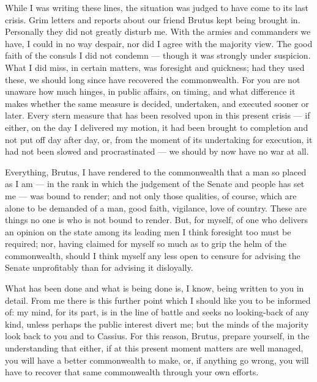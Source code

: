 

 While I was writing these lines, the situation was judged to have come to its last crisis. Grim letters and reports about our friend Brutus kept being brought in. Personally they did not greatly disturb me. With the armies and commanders we have, I could in no way despair, nor did I agree with the majority view. The good faith of the consuls I did not condemn --- though it was strongly under suspicion. What I did miss, in certain matters, was foresight and quickness; had they used these, we should long since have recovered the commonwealth. For you are not unaware how much hinges, in public affairs, on timing, and what difference it makes whether the same measure is decided, undertaken, and executed sooner or later. Every stern measure that has been resolved upon in this present crisis --- if either, on the day I delivered my motion, it had been brought to completion and not put off day after day, or, from the moment of its undertaking for execution, it had not been slowed and procrastinated --- we should by now have no war at all.

 Everything, Brutus, I have rendered to the commonwealth that a man so placed as I am --- in the rank in which the judgement of the Senate and people has set me --- was bound to render; and not only those qualities, of course, which are alone to be demanded of a man, good faith, vigilance, love of country. These are things no one is who is not bound to render. But, for myself, of one who delivers an opinion on the state among its leading men I think foresight too must be required; nor, having claimed for myself so much as to grip the helm of the commonwealth, should I think myself any less open to censure for advising the Senate unprofitably than for advising it disloyally.

 What has been done and what is being done is, I know, being written to you in detail. From me there is this further point which I should like you to be informed of: my mind, for its part, is in the line of battle and seeks no looking-back of any kind, unless perhaps the public interest divert me; but the minds of the majority look back to you and to Cassius. For this reason, Brutus, prepare yourself, in the understanding that either, if at this present moment matters are well managed, you will have a better commonwealth to make, or, if anything go wrong, you will have to recover that same commonwealth through your own efforts.
